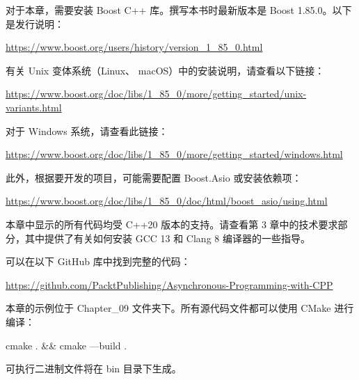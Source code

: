 对于本章，需要安装 Boost C++ 库。撰写本书时最新版本是 Boost 1.85.0。以下是发行说明：

\url{https://www.boost.org/users/history/version_1_85_0.html}

有关 Unix 变体系统（Linux、 macOS）中的安装说明，请查看以下链接：

\url{https://www.boost.org/doc/libs/1_85_0/more/getting_started/unix-variants.html}

对于 Windows 系统，请查看此链接：

\url{https://www.boost.org/doc/libs/1_85_0/more/getting_started/windows.html}

此外，根据要开发的项目，可能需要配置 Boost.Asio 或安装依赖项：

\url{https://www.boost.org/doc/libs/1_85_0/doc/html/boost_asio/using.html}

本章中显示的所有代码均受 C++20 版本的支持。请查看第 3 章中的技术要求部分，其中提供了有关如何安装 GCC 13 和 Clang 8 编译器的一些指导。

可以在以下 GitHub 库中找到完整的代码：

\url{https://github.com/PacktPublishing/Asynchronous-Programming-with-CPP}

本章的示例位于 Chapter\_09 文件夹下。所有源代码文件都可以使用 CMake 进行编译：

\begin{shell}
cmake . && cmake —build .
\end{shell}

可执行二进制文件将在 bin 目录下生成。

